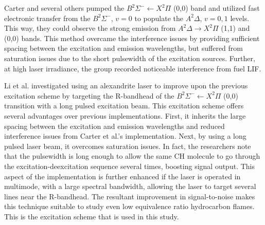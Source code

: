 Carter and several others\cite{1998-carter,1999-watson,2000-watson,2000-donbar,2000-han,2002-kothnur,2003-han-a,2003-han-b,2003-sutton} pumped the \(B^2\Sigma^-\leftarrow X^2\Pi\) (0,0) band and utilized fast electronic transfer from the \(B^2\Sigma^-\), \(v=0\) to populate the \(A^2\Delta\), \(v=0,1\) levels.
This way, they could observe the strong emission from \(A^2\Delta\rightarrow X^2\Pi\) (1,1) and (0,0) bands.
This method overcame the interference issues by providing sufficient spacing between the excitation and emission wavelengths, but suffered from saturation issues due to the short pulsewidth of the excitation sources.
Further, at high laser irradiance, the group recorded noticeable interference from fuel LIF.

Li et al.\cite{2007-li-a,2007-li-b,2007-kiefer} investigated using an alexandrite laser\cite{2004-li} to improve upon the previous excitation scheme by targeting the R-bandhead of the \(B^2\Sigma^-\leftarrow X^2\Pi\) (0,0) transition with a long pulsed excitation beam.
This excitation scheme offers several advantages over previous implementations.
First, it inherits the large spacing between the excitation and emission wavelengths and reduced interference issues from Carter et al.'s implementation.
Next, by using a long pulsed laser beam, it overcomes saturation issues.
In fact, the researchers note that the pulsewidth is long enough to allow the same CH molecule to go through the excitation-deexcitation sequence several times, boosting signal output.
This aspect of the implementation is further enhanced if the laser is operated in multimode, with a large spectral bandwidth, allowing the laser to target several lines near the R-bandhead.
The resultant improvement in signal-to-noise makes this technique suitable to study even low equivalence ratio hydrocarbon flames.
This is the excitation scheme that is used in this study.

